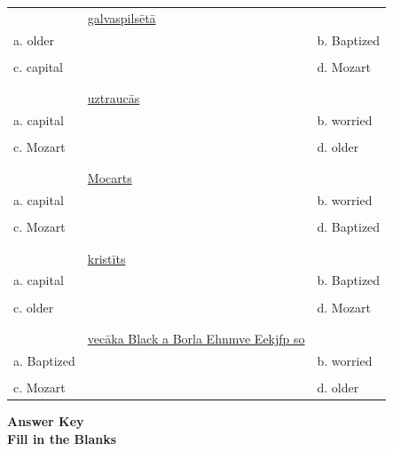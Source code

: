 \documentclass[a4paper]{article}
\begin{document}
\begin{table}[!th]
\begin{tabularx}{\textwidth}{X X X}
& \underline{galvaspilsētā} & \\
a. older & & b. Baptized \\
& \\
c. capital & & d. Mozart \\

& \\
& \\

& \underline{uztraucās} & \\
a. capital & & b. worried \\
& \\
c. Mozart & & d. older \\

& \\
& \\

& \underline{Mocarts} & \\
a. capital & & b. worried \\
& \\
c. Mozart & & d. Baptized\\

& \\
& \\

& \underline{kristīts} & \\
a. capital & & b. Baptized\\
& \\
c. older & & d. Mozart\\

& \\
& \\

& \underline{vecāka Black a Borla Ehnmve Eekjfp so} & \\
a. Baptized & & b. worried\\
& \\
c. Mozart & & d. older\\
\end{tabularx}
\end{table}

\raggedright
\pagebreak

\Huge \textbf{Answer Key}
\\ \vspace{5mm}
\Large \textbf{Fill in the Blanks}
\\ \vspace{5mm}
\end{document}
